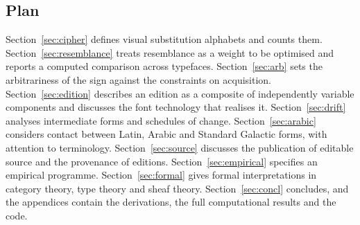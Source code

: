 \subsection{Plan}

Section~\ref{sec:cipher} defines visual substitution alphabets and counts them. Section~\ref{sec:resemblance} treats resemblance as a weight to be optimised and reports a computed comparison across typefaces. Section~\ref{sec:arb} sets the arbitrariness of the sign against the constraints on acquisition. Section~\ref{sec:edition} describes an edition as a composite of independently variable components and discusses the font technology that realises it. Section~\ref{sec:drift} analyses intermediate forms and schedules of change. Section~\ref{sec:arabic} considers contact between Latin, Arabic and Standard Galactic forms, with attention to terminology. Section~\ref{sec:source} discusses the publication of editable source and the provenance of editions. Section~\ref{sec:empirical} specifies an empirical programme. Section~\ref{sec:formal} gives formal interpretations in category theory, type theory and sheaf theory. Section~\ref{sec:concl} concludes, and the appendices contain the derivations, the full computational results and the code.
